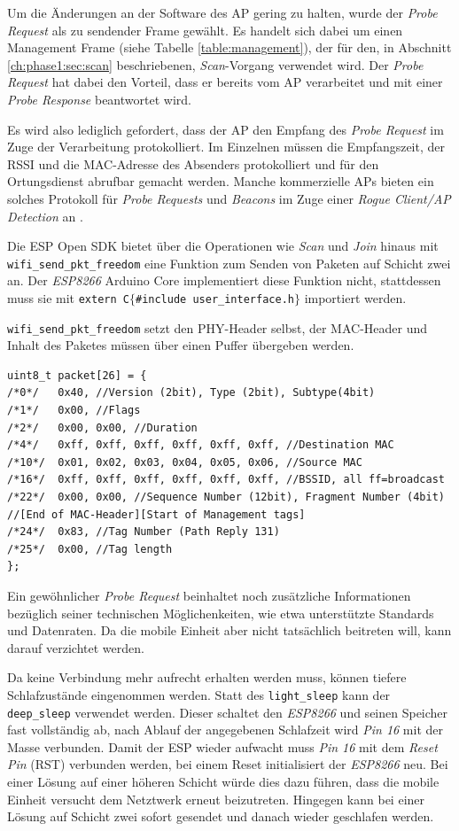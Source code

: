 Um die Änderungen an der Software des AP gering zu halten, wurde der \emph{Probe Request} als zu sendender Frame gewählt.
Es handelt sich dabei um einen Management Frame (siehe Tabelle \ref{table:management}), der für den, in Abschnitt \ref{ch:phase1:sec:scan} beschriebenen, \emph{Scan}-Vorgang verwendet wird.
Der \emph{Probe Request} hat dabei den Vorteil, dass er bereits vom AP verarbeitet und mit einer \emph{Probe Response} beantwortet wird. 

Es wird also lediglich gefordert, dass der AP den Empfang des \emph{Probe Request} im Zuge der Verarbeitung protokolliert. 
Im Einzelnen müssen die Empfangszeit, der RSSI und die MAC-Adresse des Absenders protokolliert und für den Ortungsdienst abrufbar gemacht werden. 
Manche kommerzielle APs bieten ein solches Protokoll für \emph{Probe Requests} und \emph{Beacons} im Zuge einer \textit{Rogue Client/AP Detection} an \cite{lancom2017rouge}.

Die ESP Open SDK bietet über die Operationen wie \emph{Scan} und \emph{Join} hinaus mit \texttt{wifi\_send\_pkt\_freedom} eine Funktion zum Senden von Paketen auf Schicht zwei an.
Der \emph{ESP8266} Arduino Core implementiert diese Funktion nicht, stattdessen muss sie mit \texttt{extern \dq C\dq $\lbrace$\#include \dq user\_interface.h\dq $\rbrace$} importiert werden. 

\texttt{wifi\_send\_pkt\_freedom} setzt den PHY-Header selbst, der MAC-Header und Inhalt des Paketes müssen über einen Puffer übergeben werden.
\begin{verbatim}
uint8_t packet[26] = { 
/*0*/ 	0x40, //Version (2bit), Type (2bit), Subtype(4bit)
/*1*/ 	0x00, //Flags 
/*2*/ 	0x00, 0x00, //Duration
/*4*/   0xff, 0xff, 0xff, 0xff, 0xff, 0xff, //Destination MAC
/*10*/  0x01, 0x02, 0x03, 0x04, 0x05, 0x06, //Source MAC
/*16*/  0xff, 0xff, 0xff, 0xff, 0xff, 0xff, //BSSID, all ff=broadcast
/*22*/  0x00, 0x00, //Sequence Number (12bit), Fragment Number (4bit) 
//[End of MAC-Header][Start of Management tags]
/*24*/  0x83, //Tag Number (Path Reply 131) 
/*25*/ 	0x00, //Tag length
}; 
\end{verbatim}
Ein gewöhnlicher \emph{Probe Request} beinhaltet noch zusätzliche Informationen bezüglich seiner technischen Möglichenkeiten, wie etwa unterstützte Standards und Datenraten. 
Da die mobile Einheit aber nicht tatsächlich beitreten will, kann darauf verzichtet werden. 

Da keine Verbindung mehr aufrecht erhalten werden muss, können tiefere Schlafzustände eingenommen werden. 
Statt des \texttt{light\_sleep} kann der \texttt{deep\_sleep} verwendet werden.
Dieser schaltet den \emph{ESP8266} und seinen Speicher fast vollständig ab, nach Ablauf der angegebenen Schlafzeit wird \emph{Pin 16} mit der Masse verbunden.
Damit der ESP wieder aufwacht muss \emph{Pin 16} mit dem \emph{Reset Pin} (RST) verbunden werden, bei einem Reset initialisiert der \emph{ESP8266} neu.
Bei einer Lösung auf einer höheren Schicht würde dies dazu führen, dass die mobile Einheit versucht dem Netztwerk erneut beizutreten. 
Hingegen kann bei einer Lösung auf Schicht zwei sofort gesendet und danach wieder geschlafen werden.

